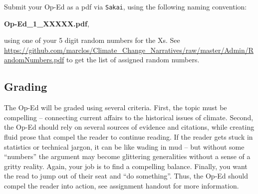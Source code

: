 Submit your Op-Ed as a pdf via \texttt{Sakai}, using the following naming convention:

\begin{center}
\textbf{Op-Ed\_1\_XXXXX.pdf},
\end{center}

\noindent using one of your 5 digit random numbers for the Xs. See \url{https://github.com/marclos/Climate_Change_Narratives/raw/master/Admin/RandomNumbers.pdf} to get the list of assigned random numbers. 

\subsection{Grading}

The Op-Ed will be graded using several criteria. First, the topic must be compelling -- connecting current affairs to the historical issues of climate. Second, the Op-Ed should rely on several sources of evidence and citations, while creating fluid prose that compel the reader to continue reading. If the reader gets stuck in statistics or technical jargon, it can be like wading in mud -- but without some ``numbers'' the argument may become glittering generalities without a sense of a gritty reality. Again, your job is to find a compelling balance. Finally, you want the read to jump out of their seat and ``do something''. Thus, the Op-Ed should compel the reader into action, see assignment handout for more information.





